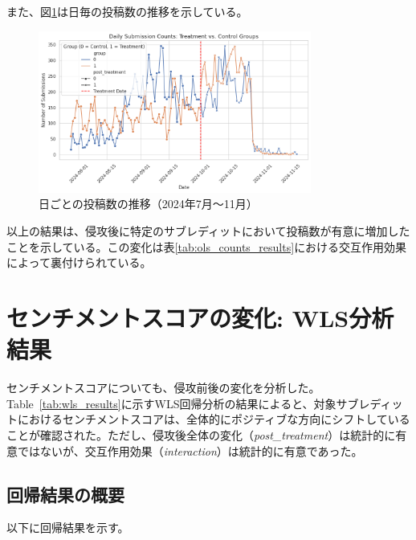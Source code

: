 \documentclass[11pt, a4j]{jreport}
\begin{document}
    また、図\ref{fig:submissions_comments_trends}は日毎の投稿数の推移を示している。
    \begin{figure}[H]
        \centering
        \includegraphics[width=0.8\textwidth]{submission_count_plot.png}
        \caption{日ごとの投稿数の推移（2024年7月～11月）}
        \label{fig:submissions_comments_trends}
    \end{figure}

    以上の結果は、侵攻後に特定のサブレディットにおいて投稿数が有意に増加したことを示している。この変化は表\ref{tab:ols_counts_results}における交互作用効果によって裏付けられている。

    \section{センチメントスコアの変化: WLS分析結果}
    センチメントスコアについても、侵攻前後の変化を分析した。Table~\ref{tab:wls_results}に示すWLS回帰分析の結果によると、対象サブレディットにおけるセンチメントスコアは、全体的にポジティブな方向にシフトしていることが確認された。ただし、侵攻後全体の変化（\textit{post\_treatment}）は統計的に有意ではないが、交互作用効果（\textit{interaction}）は統計的に有意であった。

    \subsection*{回帰結果の概要}
    以下に回帰結果を示す。

    \begin{table}[H]
    \centering
    \caption{センチメントスコアの変化に関するWLS回帰結果}
    \label{tab:wls_results}
    \end{table}
\end{document}
